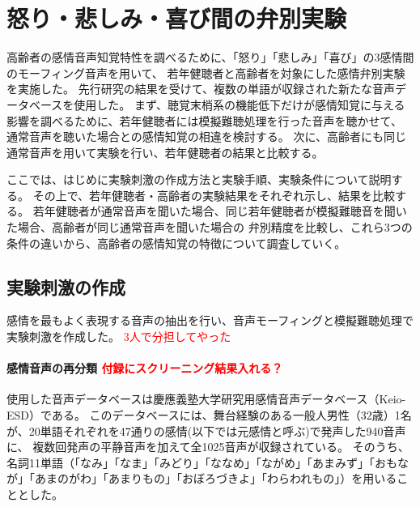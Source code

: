 \newpage
\chapter{怒り・悲しみ・喜び間の弁別実験}
\label{chap:ExpAngHapSad}

高齢者の感情音声知覚特性を調べるために、「怒り」「悲しみ」「喜び」の3感情間のモーフィング音声を用いて、
若年健聴者と高齢者を対象にした感情弁別実験を実施した。
先行研究\cite{hanatani2023Emo}の結果を受けて、複数の単語が収録された新たな音声データベース\cite{keioESD-J}を使用した。
まず、聴覚末梢系の機能低下だけが感情知覚に与える影響を調べるために、若年健聴者には模擬難聴処理を行った音声を聴かせて、
通常音声を聴いた場合との感情知覚の相違を検討する。
次に、高齢者にも同じ通常音声を用いて実験を行い、若年健聴者の結果と比較する。

ここでは、はじめに実験刺激の作成方法と実験手順、実験条件について説明する。
その上で、若年健聴者・高齢者の実験結果をそれぞれ示し、結果を比較する。
若年健聴者が通常音声を聞いた場合、同じ若年健聴者が模擬難聴音を聞いた場合、高齢者が同じ通常音声を聞いた場合の
弁別精度を比較し、これら3つの条件の違いから、高齢者の感情知覚の特徴について調査していく。

\section{実験刺激の作成}
\label{sec:PrepareStimuli}
感情を最もよく表現する音声の抽出を行い、音声モーフィングと模擬難聴処理で実験刺激を作成した。
\textcolor{red}{3人で分担してやった}

\subsubsection{感情音声の再分類 \textcolor{red}{付録にスクリーニング結果入れる？}}
使用した音声データベースは慶應義塾大学研究用感情音声データベース（Keio-ESD）\cite{keioESD-J}である。
このデータベースには、舞台経験のある一般人男性（32歳）1名が、20単語それぞれを47通りの感情(以下では元感情と呼ぶ)で発声した940音声に、
複数回発声の平静音声を加えて全1025音声が収録されている。
そのうち、名詞11単語（「なみ」「なま」「みどり」「ななめ」「ながめ」「あまみず」「おもなが」「あまのがわ」「あまりもの」「おぼろづきよ」「わらわれもの」）を用いることとした。

